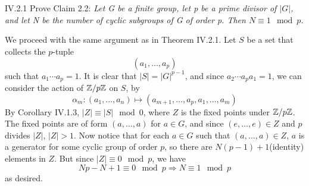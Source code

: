 \section{}

\begin{problem}{IV.2.1}
Prove Claim 2.2: 
\textit{Let G be a finite group, let p be a prime divisor of $|G|$, and let N be the number of cyclic subgroups of G of order p. Then $N \equiv 1 \mod p$.}
\end{problem}
\begin{pf}
We proceed with the same argument as in Theorem IV.2.1. Let $S$ be a set that collects the $p$-tuple
\[
(a_1,\dotsc,a_p)	
\]
such that $a_1\cdots a_p = 1$. It is clear that $|S| = |G|^{p-1}$, and since $a_2\cdots a_p a_1 = 1$, we can consider the action of $\mathbb{Z}/p\mathbb{Z}$ on $S$, by 
\[
\alpha_m : (a_1,\dotsc,a_n) \mapsto (a_{m+1},\dotsc,a_p,a_1,\dotsc,a_m)	
\]
By Corollary IV.1.3, $|Z| \equiv |S| \mod 0$, where $Z$ is the fixed points under $\mathbb{Z}/p\mathbb{Z}$. The fixed points are of form $(a,\dotsc,a)$ for $a \in G$, and since $(e,\dotsc,e) \in Z$ and $p$ divides $|Z|$, $|Z| > 1$. Now notice that for each $a \in G$ such that $(a,\dotsc,a) \in Z$, $a$ is a generator for some cyclic group of order $p$, so there are $N(p-1) + 1$(identity) elements in $Z$. But since $|Z| \equiv 0 \mod p$, we have
\[
Np - N + 1 \equiv 0 \mod p  \Longrightarrow N \equiv 1 \mod p
\]
as desired.
\end{pf}

